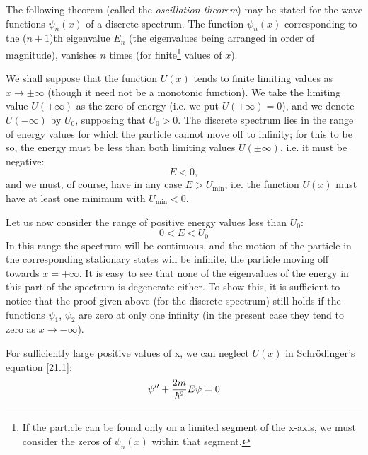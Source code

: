 The following theorem (called the \textit{oscillation theorem}) may be stated for the wave functions $\psi_n(x)$ of a discrete spectrum. The function $\psi_n(x)$ corresponding to the ($ n + 1 $)th eigenvalue $ E_n $ (the eigenvalues being arranged in order of magnitude), vanishes $ n $ times (for finite\footnote{If the particle can be found only on a limited segment of the x-axis, we must consider the zeros of $\psi_n(x)$ within that segment.} values of $ x $).

We shall suppose that the function $ U (x) $ tends to finite limiting values as $ x \to \pm\infty $ (though it need not be a monotonic function). We take the limiting value $ U (+\infty) $ as the zero of energy (i.e. we put $ U (+\infty)=0 $), and we denote $ U (-\infty) $ by $ U_0 $, supposing that $ U_0>0 $. The discrete spectrum lies in the range of energy values for which the particle cannot move off to infinity; for this to be so, the energy must be less than both limiting values $ U (\pm\infty) $, i.e. it must be negative:
\begin{equation}\label{21.3}
E<0,
\end{equation}
and we must, of course, have in any case $ E > U_{\mathrm{min}} $, i.e. the function $ U (x) $ must have at least one minimum with $ U_{\mathrm{min}} < 0 $.

Let us now consider the range of positive energy values less than $ U_0 $:
\begin{equation}\label{21.4}
0<E<U_0
\end{equation}
In this range the spectrum will be continuous, and the motion of the particle in the corresponding stationary states will be infinite, the particle moving off towards $ x =+\infty $. It is easy to see that none of the eigenvalues of the energy in this part of the spectrum is degenerate either. To show this, it is sufficient to notice that the proof given above (for the discrete spectrum) still holds if the functions $\psi_1$, $\psi_2$ are zero at only one infinity (in the present case they tend to zero as $ x \to -\infty $).

For sufficiently large positive values of x, we can neglect $ U(x) $ in Schrödinger’s equation \eqref{21.1}:
\[ \psi''+\frac{2m}{\hbar^2}E\psi=0 \]



